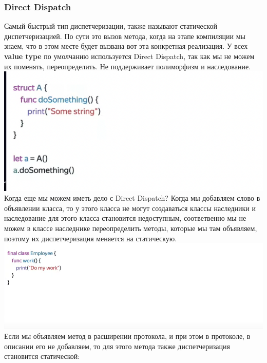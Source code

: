 \documentclass{article}
\begin{document}
    \subsubsection{Direct Dispatch}
    Самый быстрый тип диспетчеризации, также называют статической диспетчеризацией. По сути это вызов метода, когда на этапе компиляции мы знаем, что в этом месте будет вызвана вот эта конкретная реализация. У всех \textbf{value type} по умолчанию используется Direct Dispatch, так как мы не можем их поменять, переопределить. 
    \newline
    Не поддерживает полиморфизм и наследование. 
    \newline
    \includegraphics[scale = 0.5]{pic/Снимок экрана 2023-07-28 в 19.07.42.png}
    \newline
    Когда еще мы можем иметь дело с Direct Dispatch? Когда мы добавляем слово  в объявлении класса, то у этого класса не могут создаваться классы наследники и наследование для этого класса становится недоступным, соответвенно мы не можем в классе наследнике переопределить методы, которые мы там объявляем, поэтому их диспетчеризация меняется на статическую.
    \newline
    \includegraphics[scale = 0.5]{pic/Снимок экрана 2023-07-28 в 19.10.18.png}
    \newline
    Если мы объявляем метод в расширении протокола, и при этом в протоколе, в описании его не добавляем, то для этого метода также диспетчеризация становится статической: 
    \newline
\end{document}
